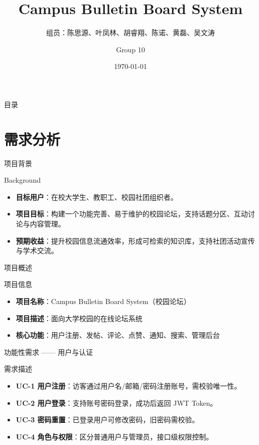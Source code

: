 \documentclass[aspectratio=169,UTF8]{ctexbeamer}
\title{Campus Bulletin Board System}
\subtitle{组员：陈思源、叶凤林、胡睿翔、陈诺、黄磊、吴文涛}
\author{Group 10}
\institute{浙江大学}
\date{\today}
\begin{document}
\begin{frame}
    \titlepage
\end{frame}

\begin{frame}{目录}
    \tableofcontents
\end{frame}

\section{需求分析}

\begin{frame}{项目背景}
    \begin{block}{Background}
        \begin{itemize}
            \item \textbf{目标用户}：在校大学生、教职工、校园社团组织者。
            \item \textbf{项目目标}：构建一个功能完善、易于维护的校园论坛，支持话题分区、互动讨论与内容管理。
            \item \textbf{预期收益}：提升校园信息流通效率，形成可检索的知识库，支持社团活动宣传与学术交流。
        \end{itemize}
    \end{block}
\end{frame}

\begin{frame}{项目概述}
    \begin{block}{项目信息}
        \begin{itemize}
            \item \textbf{项目名称}：Campus Bulletin Board System（校园论坛）
            \item \textbf{项目描述}：面向大学校园的在线论坛系统
            \item \textbf{核心功能}：用户注册、发帖、评论、点赞、通知、搜索、管理后台
        \end{itemize}
    \end{block}
\end{frame}

\begin{frame}{功能性需求 —— 用户与认证}
    \begin{block}{需求描述}
        \begin{itemize}
            \item \textbf{UC-1 用户注册}：访客通过用户名/邮箱/密码注册账号，需校验唯一性。
            \item \textbf{UC-2 用户登录}：支持账号密码登录，成功后返回 JWT Token。
            \item \textbf{UC-3 密码重置}：已登录用户可修改密码，旧密码需校验。
            \item \textbf{UC-4 角色与权限}：区分普通用户与管理员，接口级权限控制。
        \end{itemize}
    \end{block}
\end{frame}
\end{document}
